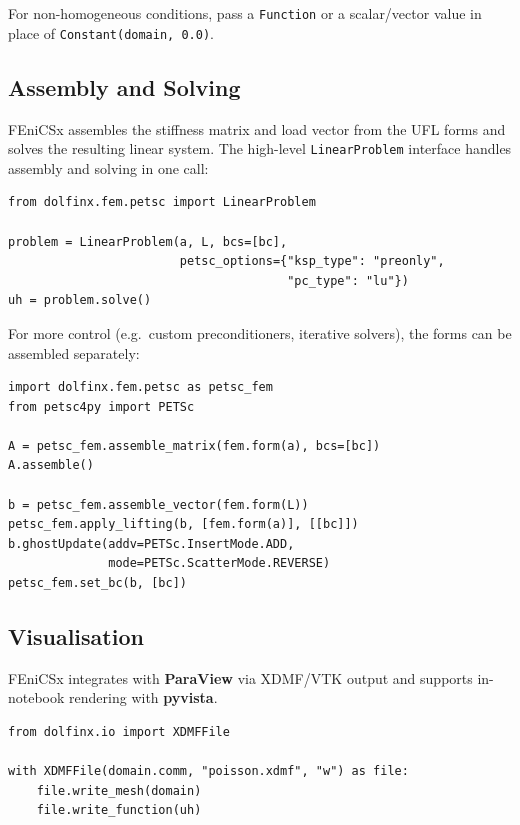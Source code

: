 \documentclass[11pt]{article}
\begin{document}
For non-homogeneous conditions, pass a \texttt{Function} or a scalar/vector
value in place of \texttt{Constant(domain, 0.0)}.

\subsection{Assembly and Solving}

FEniCSx assembles the stiffness matrix and load vector from the UFL forms
and solves the resulting linear system.
The high-level \texttt{LinearProblem} interface handles assembly and solving
in one call:

\begin{lstlisting}[style=python, caption={Solving with LinearProblem.}]
from dolfinx.fem.petsc import LinearProblem

problem = LinearProblem(a, L, bcs=[bc],
                        petsc_options={"ksp_type": "preonly",
                                       "pc_type": "lu"})
uh = problem.solve()
\end{lstlisting}

For more control (e.g.\ custom preconditioners, iterative solvers), the
forms can be assembled separately:

\begin{lstlisting}[style=python, caption={Manual assembly using \texttt{assemble\_matrix} and \texttt{assemble\_vector}.}]
import dolfinx.fem.petsc as petsc_fem
from petsc4py import PETSc

A = petsc_fem.assemble_matrix(fem.form(a), bcs=[bc])
A.assemble()

b = petsc_fem.assemble_vector(fem.form(L))
petsc_fem.apply_lifting(b, [fem.form(a)], [[bc]])
b.ghostUpdate(addv=PETSc.InsertMode.ADD,
              mode=PETSc.ScatterMode.REVERSE)
petsc_fem.set_bc(b, [bc])
\end{lstlisting}

\subsection{Visualisation}

FEniCSx integrates with \textbf{ParaView} via XDMF/VTK output and supports
in-notebook rendering with \textbf{pyvista}.

\begin{lstlisting}[style=python, caption={Writing solution to an XDMF file for ParaView.}]
from dolfinx.io import XDMFFile

with XDMFFile(domain.comm, "poisson.xdmf", "w") as file:
    file.write_mesh(domain)
    file.write_function(uh)
\end{lstlisting}
\end{document}
